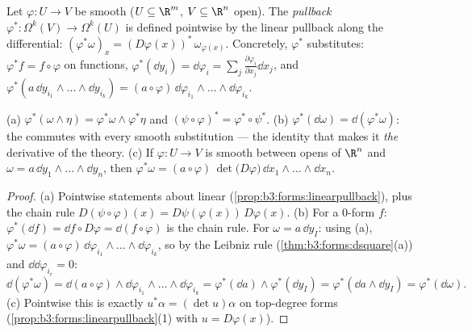 \begin{definition}[Pullback]\label{def:b3:forms:pullback}
Let $\varphi\colon U \to V$ be smooth ($U \subseteq \R^m$,
$V \subseteq \R^n$ open). The \emph{pullback}
$\varphi^*\colon \Omega^k(V) \to \Omega^k(U)$ is defined
pointwise by the linear pullback along the differential:
$(\varphi^*\omega)_x = (D\varphi(x))^*\,\omega_{\varphi(x)}$.
Concretely, $\varphi^*$ substitutes: $\varphi^*f = f \circ
\varphi$ on functions, $\varphi^*(\dd y_i) =
\dd\varphi_i = \sum_j\frac{\partial\varphi_i}{\partial
x_j}\dd x_j$, and $\varphi^*(a\,\dd y_{i_1}\wedge\dots\wedge
\dd y_{i_k}) =
(a\circ\varphi)\,\dd\varphi_{i_1}\wedge\dots\wedge
\dd\varphi_{i_k}$.
\end{definition}

\begin{theorem}\label{thm:b3:forms:pullback}
(a) $\varphi^*(\omega \wedge \eta) = \varphi^*\omega \wedge
\varphi^*\eta$ and $(\psi \circ \varphi)^* = \varphi^* \circ
\psi^*$.
(b) $\varphi^*(\dd\omega) = \dd(\varphi^*\omega)$: the
 commutes with every smooth substitution
--- the identity that makes it \emph{the} derivative of the
theory.
(c) If $\varphi\colon U \to V$ is smooth between opens of
$\R^n$ and $\omega = a\,\dd y_1 \wedge \dots \wedge \dd
y_n$, then $\varphi^*\omega = (a \circ
\varphi)\,\det\bigl(D\varphi\bigr)\,\dd x_1 \wedge \dots
\wedge \dd x_n$.
\end{theorem}

\begin{proof}
(a) Pointwise statements about linear 
(\cref{prop:b3:forms:linearpullback}), plus the chain rule
$D(\psi\circ\varphi)(x) = D\psi(\varphi(x))\,D\varphi(x)$.
(b) For a $0$-form $f$: $\varphi^*(\dd f) = \dd f \circ
D\varphi = \dd(f \circ \varphi)$ is the chain rule. For
$\omega = a\,\dd y_I$: using (a), $\varphi^*\omega =
(a\circ\varphi)\,\dd\varphi_{i_1}\wedge\dots\wedge
\dd\varphi_{i_k}$, so by the Leibniz rule
(\cref{thm:b3:forms:dsquare}(a)) and $\dd\dd\varphi_{i_r} =
0$:
\[
\dd(\varphi^*\omega) = \dd(a\circ\varphi) \wedge
\dd\varphi_{i_1}\wedge\dots\wedge\dd\varphi_{i_k}
= \varphi^*(\dd a) \wedge \varphi^*(\dd y_I)
= \varphi^*(\dd a \wedge \dd y_I) =
\varphi^*(\dd\omega).
\]
(c) Pointwise this is exactly $u^*\alpha = (\det u)\alpha$
on top-degree forms (\cref{prop:b3:forms:linearpullback}(1)
with $u = D\varphi(x)$).
\end{proof}

